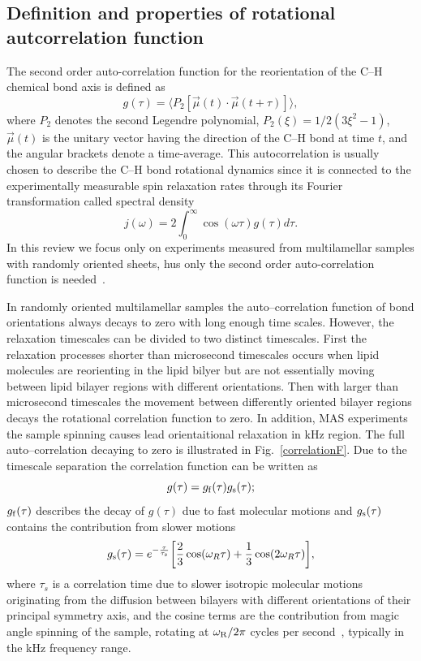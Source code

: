 \documentclass[aps,prl,superscriptaddress,twocolumn]{revtex4}
\begin{document}
\subsection{Definition and properties of rotational autcorrelation function}
The second order auto-correlation function for the reorientation of the C--H chemical bond axis is defined as \cite{Lip82:4546}
\begin{equation}\label{gt}
g(\tau) = \langle P_2[\vec{\mu}(t)\cdot\vec{\mu}(t+\tau)]\rangle,
\end{equation} 
where $P_2$ denotes the second Legendre polynomial, $P_2(\xi) = 1/2 (3\xi^2 - 1)$, $\vec{\mu}(t)$ is the unitary vector having the 
direction of the C--H bond at time $t$, and the angular brackets denote a time-average. This autocorrelation is usually chosen
to describe the C--H bond rotational dynamics since it is connected to the experimentally measurable spin relaxation rates 
through its Fourier transformation called spectral density
\begin{equation}\label{FT}
j(\omega) =  2\int_0^{\infty} \cos(\omega \tau) g(\tau) d\tau.
\end{equation}
In this review we focus only on experiments measured from multilamellar samples with randomly oriented sheets, 
hus only the second order auto-correlation function is needed~\cite{??}. 

In randomly oriented multilamellar samples the auto--correlation function of bond orientations always decays to zero with
long enough time scales. However, the relaxation timescales can be divided to two distinct timescales.
First the relaxation processes shorter than microsecond timescales occurs when lipid molecules are reorienting
in the lipid bilyer but are not essentially moving between lipid bilayer regions with different orientations.
Then with larger than microsecond timescales the movement between differently oriented bilayer regions
decays the rotational correlation function to zero. In addition, MAS experiments the sample spinning
causes lead orientaitional relaxation in kHz region. The full auto--correlation decaying to zero 
is illustrated in Fig.~\ref{correlationF}. Due to the timescale separation the correlation function can 
be written as~\cite{Now10:16848}
\begin{equation}\label{corrF}
g(\tau)=g_{\rm{f}}(\tau) g_{\rm{s}}(\tau);
\end{equation}
$g_{\rm{f}}(\tau)$ describes the decay of $g(\tau)$ due to fast molecular motions and $g_{\rm{s}}(\tau)$ contains the contribution from slower motions
\begin{equation}\label{MAS}
g_{\rm{s}}(\tau)= e^{- \frac{\tau}{\tau_{\rm{s}}}} \bigg[ \frac{2}{3}\cos(\omega_R \tau) + \frac{1}{3}\cos(2\omega_R \tau)\bigg],
\end{equation}
where $\tau_s$ is a correlation time due to slower isotropic molecular motions originating from the diffusion between bilayers 
with different orientations of their principal symmetry axis, and the cosine terms are the contribution from magic angle spinning 
of the sample, rotating at $\omega_{\rm{R}}/2\pi$ cycles per second~\cite{Hir06:307}, typically in the kHz frequency range. 
\end{document}
